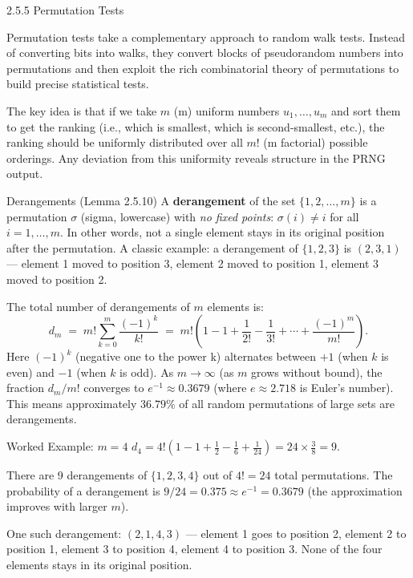 \documentclass[aspectratio=169,10pt]{beamer}
\begin{document}
\begin{frame}[allowframebreaks]{2.5.5 Permutation Tests}

Permutation tests take a complementary approach to random walk tests.
Instead of converting bits into walks, they convert blocks of pseudorandom
numbers into permutations and then exploit the rich combinatorial theory of
permutations to build precise statistical tests.

The key idea is that if we take $m$ (m) uniform numbers $u_1, \ldots, u_m$
and sort them to get the ranking (i.e., which is smallest, which is
second-smallest, etc.), the ranking should be uniformly distributed over
all $m!$ (m factorial) possible orderings.  Any deviation from this
uniformity reveals structure in the PRNG output.

\begin{block}{Derangements (Lemma 2.5.10)}
A \textbf{derangement} of the set $\{1, 2, \ldots, m\}$ is a permutation
$\sigma$ (sigma, lowercase) with \emph{no fixed points}: $\sigma(i) \ne i$
for all $i = 1, \ldots, m$.  In other words, not a single element stays in
its original position after the permutation.  A classic example: a
derangement of $\{1,2,3\}$ is $(2,3,1)$ --- element 1 moved to position 3,
element 2 moved to position 1, element 3 moved to position 2.

The total number of derangements of $m$ elements is:
\[
  d_m \;=\; m!\sum_{k=0}^m \frac{(-1)^k}{k!}
       \;=\; m!\!\left(1 - 1 + \frac{1}{2!} - \frac{1}{3!}
             + \cdots + \frac{(-1)^m}{m!}\right).
\]
Here $(-1)^k$ (negative one to the power k) alternates between $+1$
(when $k$ is even) and $-1$ (when $k$ is odd).  As $m \to \infty$
(as $m$ grows without bound), the fraction $d_m / m!$ converges to
$e^{-1} \approx 0.3679$ (where $e \approx 2.718$ is Euler's number).
This means approximately $36.79\%$ of all random permutations of large
sets are derangements.
\end{block}

\begin{exampleblock}{Worked Example: $m = 4$}
$d_4 = 4!\!\left(1 - 1 + \frac{1}{2} - \frac{1}{6} + \frac{1}{24}\right)
     = 24 \times \frac{3}{8} = 9$.

There are 9 derangements of $\{1, 2, 3, 4\}$ out of $4! = 24$ total
permutations.  The probability of a derangement is
$9/24 = 0.375 \approx e^{-1} = 0.3679$ (the approximation improves
with larger $m$).

One such derangement: $(2, 1, 4, 3)$ --- element 1 goes to position 2,
element 2 to position 1, element 3 to position 4, element 4 to position 3.
None of the four elements stays in its original position.
\end{exampleblock}


\end{frame}
\end{document}
